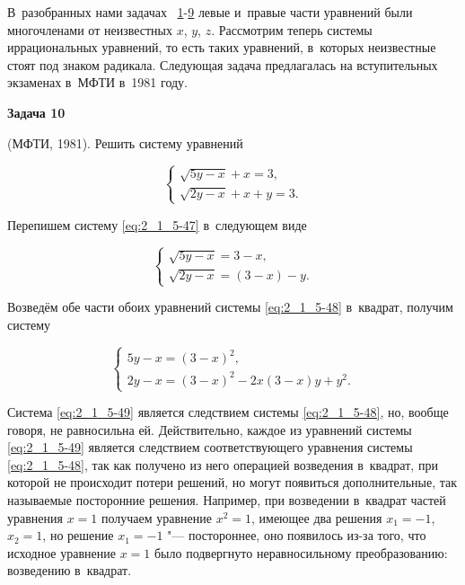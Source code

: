 
В~разобранных нами задачах
\textnumero\textnumero~\hyperlink{ex:2_1_1_1}{1}-\hyperlink{ex:2_1_4_9}{9}
левые и~правые части уравнений были многочленами от неизвестных $x$, $y$, $z$.
Рассмотрим теперь системы иррациональных уравнений, то есть таких
уравнений, в~которых неизвестные стоят под знаком радикала.
Следующая задача предлагалась на вступительных экзаменах в~МФТИ в~1981 году.

\hypertarget{ex:2_1_5_10}{\textbf{Задача 10}} (МФТИ, 1981). Решить систему уравнений

\begin{equation}\label{eq:2_1_5-47}
\begin{cases}
\sqrt{5y - x} + x = 3, \\
\sqrt{2y - x} + x + y = 3.
\end{cases}
\end{equation}

Перепишем систему \eqref{eq:2_1_5-47} в~следующем виде

\begin{equation}\label{eq:2_1_5-48}
\begin{cases}
\sqrt{5y - x} = 3 - x, \\
\sqrt{2y - x} = (3 - x) - y.
\end{cases}
\end{equation}

Возведём обе части обоих уравнений системы \eqref{eq:2_1_5-48} в~квадрат,
получим систему

\begin{equation}\label{eq:2_1_5-49}
\begin{cases}
5y - x = (3 - x)^{2}, \\
2y - x = (3 - x)^{2} - 2x(3 - x)y + y^{2}.
\end{cases}
\end{equation}

Система \eqref{eq:2_1_5-49} является следствием системы \eqref{eq:2_1_5-48},
но, вообще говоря, не равносильна ей. Действительно, каждое из уравнений
системы \eqref{eq:2_1_5-49} является следствием соответствующего уравнения
системы \eqref{eq:2_1_5-48}, так как получено из него операцией возведения
в~квадрат, при которой не происходит потери решений, но могут появиться
дополнительные, так называемые посторонние решения.
Например, при возведении в~квадрат частей уравнения $x = 1$ получаем
уравнение $x^{2} = 1$, имеющее два решения $x_{1} = -1$, $x_{2} = 1$,
но решение $x_{1} = -1$ "--- постороннее, оно появилось из-за того,
что исходное уравнение $x = 1$ было подвергнуто неравносильному
преобразованию: возведению в~квадрат.

